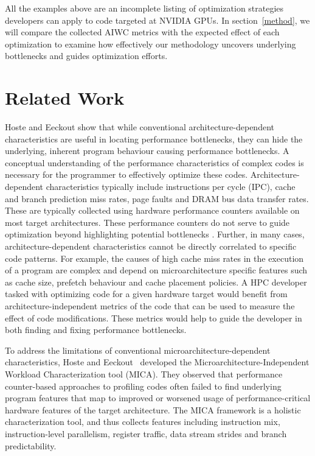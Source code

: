 \documentclass[review=false, sigchi]{acmart}
\begin{document}
	All the examples above are an incomplete listing of optimization strategies developers can apply to code targeted at NVIDIA GPUs.
	In section~\ref{method}, we will compare the collected AIWC metrics with the expected effect of each optimization to examine how effectively our methodology uncovers underlying bottlenecks and guides optimization efforts.
	
	\flushbottom
	\section{Related Work} \label{related work}
	
	Hoste and Eeckout \cite{hoste2007microarchitecture} show that while conventional architecture-dependent characteristics are useful in locating performance bottlenecks, they can hide the underlying, inherent program behaviour causing performance bottlenecks.
	A conceptual understanding of the performance characteristics of complex codes is necessary for the programmer to effectively optimize these codes.
	Architecture-dependent characteristics typically include instructions per cycle (IPC), cache and branch prediction miss rates, page faults and DRAM bus data transfer rates. These are typically collected using hardware performance counters available on most target architectures. These performance counters do not serve to guide optimization beyond highlighting potential bottlenecks \cite{hoste2007microarchitecture, ganesan2008performance}.
	Further, in many cases, architecture-dependent characteristics cannot be directly correlated to specific code patterns.
	For example, the causes of high cache miss rates in the execution of a program are complex and depend on microarchitecture specific features such as cache size, prefetch behaviour and cache placement policies.
	A HPC developer tasked with optimizing code for a given hardware target would benefit from architecture-independent metrics of the code that can be used to measure the effect of code modifications.
    These metrics would help to guide the developer in both finding and fixing performance bottlenecks.
	
	To address the limitations of conventional microarchitecture-dependent characteristics, Hoste and Eeckout~\cite{hoste2007microarchitecture} developed the Microarchitecture-Independent Workload Characterization tool (MICA).
	They observed that performance counter-based approaches to profiling codes often failed to find underlying program features that map to improved or worsened usage of performance-critical hardware features of the target architecture.
	The MICA framework is a holistic characterization tool, and thus collects features including instruction mix, instruction-level parallelism, register traffic, data stream strides and branch predictability.
	
\end{document}

